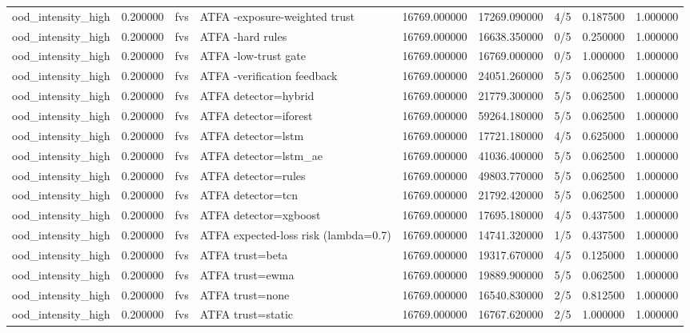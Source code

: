 \begin{tabular}{lrllrrlrr}
ood\_intensity\_high & 0.200000 & fvs & ATFA -exposure-weighted trust & 16769.000000 & 17269.090000 & 4/5 & 0.187500 & 1.000000 \\
ood\_intensity\_high & 0.200000 & fvs & ATFA -hard rules & 16769.000000 & 16638.350000 & 0/5 & 0.250000 & 1.000000 \\
ood\_intensity\_high & 0.200000 & fvs & ATFA -low-trust gate & 16769.000000 & 16769.000000 & 0/5 & 1.000000 & 1.000000 \\
ood\_intensity\_high & 0.200000 & fvs & ATFA -verification feedback & 16769.000000 & 24051.260000 & 5/5 & 0.062500 & 1.000000 \\
ood\_intensity\_high & 0.200000 & fvs & ATFA detector=hybrid & 16769.000000 & 21779.300000 & 5/5 & 0.062500 & 1.000000 \\
ood\_intensity\_high & 0.200000 & fvs & ATFA detector=iforest & 16769.000000 & 59264.180000 & 5/5 & 0.062500 & 1.000000 \\
ood\_intensity\_high & 0.200000 & fvs & ATFA detector=lstm & 16769.000000 & 17721.180000 & 4/5 & 0.625000 & 1.000000 \\
ood\_intensity\_high & 0.200000 & fvs & ATFA detector=lstm\_ae & 16769.000000 & 41036.400000 & 5/5 & 0.062500 & 1.000000 \\
ood\_intensity\_high & 0.200000 & fvs & ATFA detector=rules & 16769.000000 & 49803.770000 & 5/5 & 0.062500 & 1.000000 \\
ood\_intensity\_high & 0.200000 & fvs & ATFA detector=tcn & 16769.000000 & 21792.420000 & 5/5 & 0.062500 & 1.000000 \\
ood\_intensity\_high & 0.200000 & fvs & ATFA detector=xgboost & 16769.000000 & 17695.180000 & 4/5 & 0.437500 & 1.000000 \\
ood\_intensity\_high & 0.200000 & fvs & ATFA expected-loss risk (lambda=0.7) & 16769.000000 & 14741.320000 & 1/5 & 0.437500 & 1.000000 \\
ood\_intensity\_high & 0.200000 & fvs & ATFA trust=beta & 16769.000000 & 19317.670000 & 4/5 & 0.125000 & 1.000000 \\
ood\_intensity\_high & 0.200000 & fvs & ATFA trust=ewma & 16769.000000 & 19889.900000 & 5/5 & 0.062500 & 1.000000 \\
ood\_intensity\_high & 0.200000 & fvs & ATFA trust=none & 16769.000000 & 16540.830000 & 2/5 & 0.812500 & 1.000000 \\
ood\_intensity\_high & 0.200000 & fvs & ATFA trust=static & 16769.000000 & 16767.620000 & 2/5 & 1.000000 & 1.000000 \\

\end{tabular}
